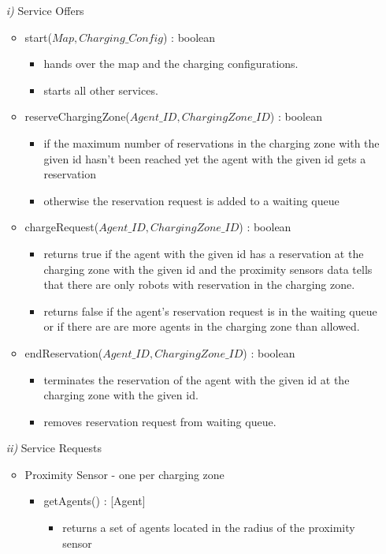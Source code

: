 \documentclass{article}
\begin{document}
\begin{enumerate}
	\item[\textit{i)}] Service Offers
	\begin{itemize}
		\item start($Map, Charging\_Config$) : boolean
		\begin{itemize}
			\item hands over the map and the charging configurations.
			\item starts all other services.
		\end{itemize}
		\item reserveChargingZone($Agent\_ID, ChargingZone\_ID$) : boolean
		\begin{itemize}
			\item if the maximum number of reservations in the charging zone with the given id hasn't been
reached yet the agent with the given id gets a reservation
			\item otherwise the reservation request is added to a waiting queue
		\end{itemize}
		\item chargeRequest($Agent\_ID, ChargingZone\_ID$) : boolean
		\begin{itemize}
			\item returns true if the agent with the given id has a reservation at the charging zone with the given id and the proximity sensors data tells that there are only robots with reservation in the charging zone.
			\item returns false if the agent's reservation request is in the waiting queue or if there are are more agents in the charging zone than allowed.
		\end{itemize}
		\item endReservation($Agent\_ID, ChargingZone\_ID$) : boolean
		\begin{itemize}
			\item terminates the reservation of the agent with the given id at the charging zone with the given id.
			\item removes reservation request from waiting queue.
		\end{itemize}
	\end{itemize}
	\item[\textit{ii)}] Service Requests
	\begin{itemize}
		\item Proximity Sensor - one per charging zone
		\begin{itemize}
			\item getAgents() : [Agent]
			\begin{itemize}
				\item returns a set of agents located in the radius of the proximity sensor
			\end{itemize}
		\end{itemize}
	\end{itemize}
\end{enumerate}
\end{document}
